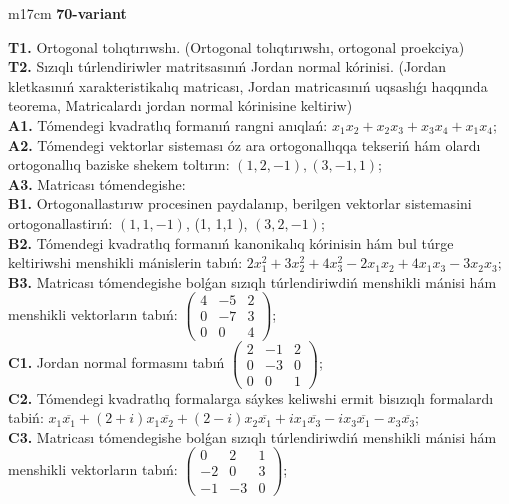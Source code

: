 \documentclass{article}
\begin{document}
\begin{tabular}{m{17cm}}
\textbf{70-variant}
\newline

\textbf{T1.} Ortogonal  tolıqtırıwshı. (Ortogonal tolıqtırıwshı,  ortogonal proekciya) \\
\textbf{T2.} Sızıqlı túrlendiriwler matritsasınıń Jordan normal kórinisi. (Jordan kletkasınıń xarakteristikalıq matricası, Jordan matricasınıń uqsaslıǵı haqqında teorema,  Matricalardı jordan normal kórinisine keltiriw) \\
\textbf{A1.} Tómendegi kvadratlıq formanıń rangni anıqlań: \(x_{1}x_{2} + x_{2}x_{3} + x_{3}x_{4} + x_{1}x_{4}\); \\
\textbf{A2.} Tómendegi vektorlar sisteması óz ara ortogonallıqqa tekseriń hám olardı ortogonallıq baziske shekem toltırın: \((1,2, - 1),(3, - 1,1)\); \\
\textbf{A3.} Matricası tómendegishe: \\
\textbf{B1.} Ortogonallastırıw procesinen paydalanıp, berilgen vektorlar sistemasini ortogonallastirıń: \((1,1, - 1)\), (1, 1,1 ), \((3,2, - 1)\); \\
\textbf{B2.} Tómendegi kvadratlıq formanıń kanonikalıq kórinisin hám bul túrge keltiriwshi menshikli mánislerin tabıń: \(2x_{1}^{2} + 3x_{2}^{2} + 4x_{3}^{2} - 2x_{1}x_{2} + 4x_{1}x_{3} - 3x_{2}x_{3}\); \\
\textbf{B3.} Matricası tómendegishe bolǵan sızıqlı túrlendiriwdiń menshikli mánisi hám menshikli vektorların tabıń: \(\begin{pmatrix} 4 & - 5 & 2 \\ 0 & - 7 & 3 \\ 0 & 0 & 4 \end{pmatrix}\); \\
\textbf{C1.} Jordan normal formasını tabıń \(\begin{pmatrix} 2 & - 1 & 2 \\ 0 & - 3 & 0 \\ 0 & 0 & 1 \end{pmatrix}\); \\
\textbf{C2.} Tómendegi kvadratlıq formalarga sáykes keliwshi ermit bisızıqlı formalardı tabiń: \(x_{1}\overline{x_{1}} + (2 + i)x_{1}\overline{x_{2}} + (2 - i)x_{2}\overline{x_{1}} + ix_{1}\overline{x_{3}} - ix_{3}\overline{x_{1}} - x_{3}\overline{x_{3}}\); \\
\textbf{C3.} Matricası tómendegishe bolǵan sızıqlı túrlendiriwdiń menshikli mánisi hám menshikli vektorların tabıń: \(\begin{pmatrix} 0 & 2 & 1 \\  - 2 & 0 & 3 \\  - 1 & - 3 & 0 \end{pmatrix}\); \\

\end{tabular}
\vspace{1cm}
\end{document}
